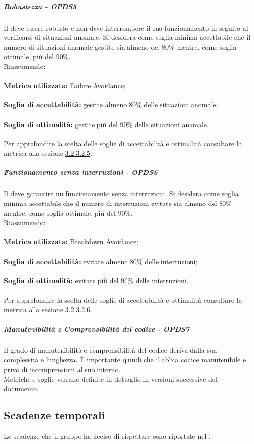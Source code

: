 \documentclass[PianoDiQualifica.tex]{subfiles}
\begin{document}
				\subparagraph{Robustezza - OPDS5}
				Il  deve essere robusto e non deve interrompere il suo funzionamento in seguito al verificarsi di situazioni anomale.
				Si desidera come soglia minima accettabile che il numero di situazioni anomale gestite sia almeno del 80\% mentre, come soglia ottimale, più del 90\%. \\
				Riassumendo: \\ \\
				\textbf{Metrica utilizzata:} Failure Avoidance;\\ \\
				\textbf{Soglia di accettabilità:} gestite almeno 80\% delle situazioni anomale; \\ \\
				\textbf{Soglia di ottimalità:} gestite più del 90\% delle situazioni anomale. \\ \\
				Per approfondire la scelta delle soglie di accettabilità e ottimalità consultare la metrica alla sezione \hyperlink{failure}{3.2.3.2.5}.
				
				\subparagraph{Funzionamento senza interruzioni - OPDS6}
				Il  deve garantire un funzionamento senza interruzioni.
				Si desidera come soglia minima accettabile che il numero di interruzioni evitate sia almeno del 80\% mentre, come soglia ottimale, più del 90\%. \\
				Riassumendo: \\ \\
				\textbf{Metrica utilizzata:} Breakdown Avoidance;\\ \\
				\textbf{Soglia di accettabilità:} evitate almeno 80\% delle interruzioni; \\ \\
				\textbf{Soglia di ottimalità:} evitate più del 90\% delle interruzioni. \\ \\
				Per approfondire la scelta delle soglie di accettabilità e ottimalità consultare la metrica alla sezione \hyperlink{breakdown}{3.2.3.2.6}.
				
				\subparagraph{Manutenibilità e Comprensibilità del codice - OPDS7}
				Il grado di manutenibilità e comprensibilità del codice deriva dalla sua complessità e lunghezza. È importante quindi che il  abbia codice manutenibile e
				privo di incomprensioni al suo interno. \\
				Metriche e soglie verrano definite in dettaglio in versioni successive del documento.
				
		\subsection{Scadenze temporali}
		Le scadenze che il gruppo \GRUPPO{} ha deciso di rispettare sono riportate nel \PPdocRR{}.
				
\end{document}
